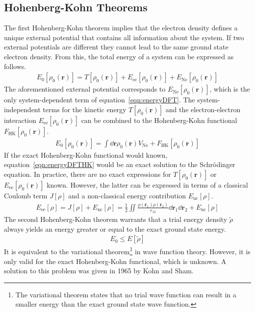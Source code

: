 \subsection{Hohenberg-Kohn Theorems}
\label{sec:HKtheorems}

The first Hohenberg-Kohn theorem implies that the electron density defines a
unique external potential that contains all information about the system. If
two external potentials are different they cannot lead to the same ground state
electron density. From this, the total energy of a system can be expressed as follows.
%
\begin{align}
    E_0\left[ \rho_0(\mathbf{r}) \right] = T\left[ \rho_0(\mathbf{r}) \right] + E_\text{ee} \left[ \rho_0(\mathbf{r}) \right] + E_\text{Ne} \left[ \rho_0(\mathbf{r}) \right]\label{eqn:energyDFT}
\end{align}
%
The aforementioned external potential corresponds to $E_\text{Ne} \left[
    \rho_0(\mathbf{r}) \right]$, which is the only system-dependent term of
equation~\eqref{eqn:energyDFT}. The system-independent terms for the kinetic
energy $T\left[ \rho_0(\mathbf{r}) \right]$ and the electron-electron
interaction $E_\text{ee} \left[ \rho_0(  \mathbf{r}) \right]$ can be combined
to the Hohenberg-Kohn functional $F_\text{HK}\left[ \rho_0(
\mathbf{r})\right]$.
%
\begin{align}
    E_0\left[ \rho_0(\mathbf{r}) \right] = \int\dd\mathbf{r}\rho_0(\mathbf{r})V_\text{Ne}+ F_\text{HK}\left[ \rho_0(\mathbf{r})\right]\label{eqn:energyDFTHK}
\end{align}
%
If the exact Hohenberg-Kohn functional would known,
equation~\eqref{eqn:energyDFTHK} would be an exact solution to the
Schr\"odinger equation. In practice, there are no exact expressions for
$T\left[ \rho_0(\mathbf{r}) \right]$ or $E_\text{ee} \left[ \rho_0(
\mathbf{r}) \right]$ known. However, the latter can be expressed in terms of a
classical Coulomb term $J\left[\rho\right]$ and a non-classical energy contribution
$E_\text{nc}\left[\rho\right]$.
%
\begin{align}
    E_\text{ee} \left[ \rho \right]=J\left[\rho\right]+E_\text{nc}\left[\rho\right]=\frac{1}{2}\iint\frac{\rho(\mathbf{r}_1)\rho(\mathbf{r}_2)}{r_{12}}\dd\mathbf{r}_1\dd\mathbf{r}_2+E_\text{nc}\left[\rho\right]
\end{align}
%
The second Hohenberg-Kohn theorem warrants that a trial energy density
$\widetilde{\rho}$ always yields an energy greater or equal to the exact ground
state energy.
%
\begin{align}
    E_0 \leq E\left[\widetilde{\rho}\right]
\end{align}
%
It is equivalent to the variational theorem\footnote{The variational theorem
states that no trial wave function can result in a smaller energy than the
exact ground state wave function.} in wave function theory. However, it is only
valid for the exact Hohenberg-Kohn functional, which is unknown. A solution to
this problem was given in 1965 by Kohn and
Sham.\autocite{Kohn_SelfConsistentEquationsIncluding_1965}

